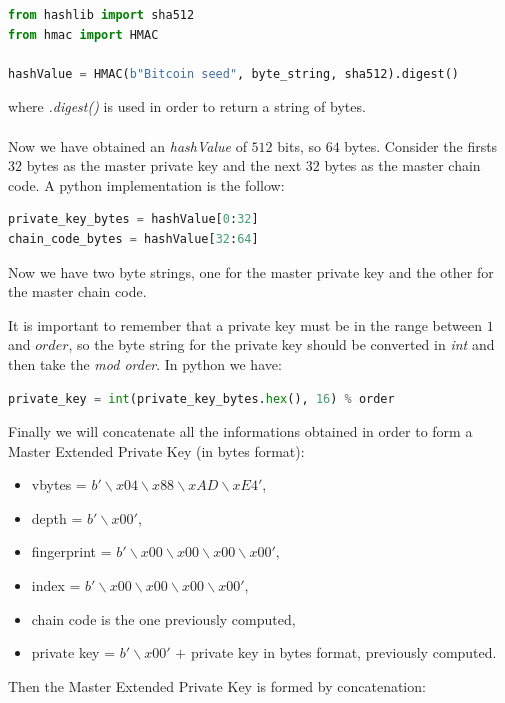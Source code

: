 \begin{lstlisting}[language=Python]
from hashlib import sha512
from hmac import HMAC

hashValue = HMAC(b"Bitcoin seed", byte_string, sha512).digest()
\end{lstlisting}
where \textit{.digest()} is used in order to return a string of bytes.
\\ \\
Now we have obtained an \textit{hashValue} of $512$ bits, so $64$ bytes. Consider the firsts $32$ bytes as the master private key and the next $32$ bytes as the master chain code. A python implementation is the follow:

\begin{lstlisting}[language=Python]
private_key_bytes = hashValue[0:32]
chain_code_bytes = hashValue[32:64]
\end{lstlisting}
\begin{flushleft}
	Now we have two byte strings, one for the master private key and the other for the master chain code.
\end{flushleft}
It is important to remember that a private key must be in the range between $1$ and $order$, so the byte string for the private key should be converted in \textit{int} and then take the \textit{mod order}. In python we have:

\begin{lstlisting}[language=Python]
private_key = int(private_key_bytes.hex(), 16) % order
\end{lstlisting}
\begin{flushleft}
	Finally we will concatenate all the informations obtained in order to form a Master Extended Private Key (in bytes format):
\end{flushleft}

\begin{itemize}
	\item vbytes = $b'\backslash x04\backslash x88\backslash xAD\backslash xE4'$,
	\item depth = $b'\backslash x00'$,
	\item fingerprint = $b'\backslash x00\backslash x00\backslash x00\backslash x00'$,
	\item index = $b'\backslash x00\backslash x00\backslash x00\backslash x00'$,
	\item chain code is the one previously computed,
	\item private key = $b'\backslash x00'$ $+$ private key in bytes format, previously computed.
\end{itemize}
Then the Master Extended Private Key is formed by concatenation:

